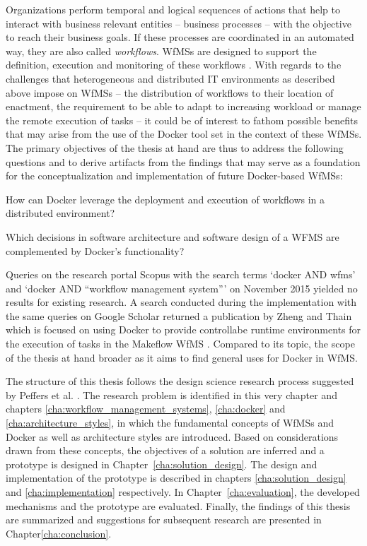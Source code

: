 Organizations perform temporal and logical sequences of actions that help to interact with business relevant entities -- business processes -- with the objective to reach their business goals. If these processes are coordinated in an automated way, they are also called \emph{workflows}. \acp{WfMS} are designed to support the definition, execution and monitoring of these workflows \cite{Becker1999Identifying,Hollingsworth1995Wfmc}.
With regards to the challenges that heterogeneous and distributed \ac{IT} environments as described above impose on \acp{WfMS} -- \eg the distribution of workflows to their location of enactment, the requirement to be able to adapt to increasing workload or manage the remote execution of tasks -- it could be of interest to fathom possible benefits that may arise from the use of the Docker tool set in the context of these \acp{WfMS}. The primary objectives of the thesis at hand are thus to address the following questions and to derive artifacts from the findings that may serve as a foundation for the conceptualization and implementation of future Docker-based \acp{WfMS}:

\begin{description}[nosep]
  \item[RQ1:] How can Docker leverage the deployment and execution of workflows in a distributed environment?
  \item[RQ2:] Which decisions in software architecture and software design of a WFMS are complemented by Docker's functionality?
\end{description}

Queries on the research portal Scopus with the search terms `docker AND wfms' and `docker AND ``workflow management system''' on November  2015 yielded no results for existing research. A search conducted during the implementation with the same queries on Google Scholar returned a publication by Zheng and Thain which is focused on using Docker to provide controllabe runtime environments for the execution of tasks in the Makeflow \ac{WfMS} \cite{Zheng2015Integrating}. Compared to its topic, the scope of the thesis at hand broader as it aims to find general uses for Docker in \ac{WfMS}.

The structure of this thesis follows the design science research process suggested by Peffers et al. \cite[pp.~89-92]{Peffers2007Design}. The research problem is identified in this very chapter and chapters \ref{cha:workflow_management_systems}, \ref{cha:docker} and \ref{cha:architecture_styles}, in which the fundamental concepts of \acp{WfMS} and Docker as well as architecture styles are introduced.
Based on considerations drawn from these concepts, the objectives of a solution are inferred and a prototype is designed in Chapter~\ref{cha:solution_design}. The design and implementation of the prototype is described in chapters \ref{cha:solution_design} and \ref{cha:implementation} respectively. In Chapter~\ref{cha:evaluation}, the developed mechanisms and the prototype are evaluated. Finally, the findings of this thesis are summarized and suggestions for subsequent research are presented in Chapter\ref{cha:conclusion}.
